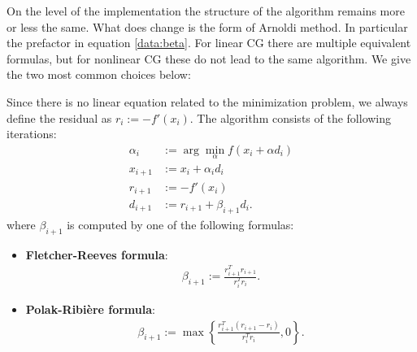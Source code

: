    On the level of the implementation the structure of the algorithm remains more or less the same. What does change is the form of Arnoldi method. In particular the prefactor in equation \ref{data:beta}. For linear CG there are multiple equivalent formulas, but for nonlinear CG these do not lead to the same algorithm. We give the two most common choices below:
    \begin{method}[Nonlinear CG]
        Since there is no linear equation related to the minimization problem, we always define the residual as $r_i:=-f'(x_i)$. The algorithm consists of the following iterations:
        \begin{align}
            \alpha_i &:= \arg\min_\alpha f(x_i+\alpha d_i)\label{data:argmin}\\
            x_{i+1} &:= x_i+\alpha_id_i\\
            r_{i+1} &:= -f'(x_i)\\
            d_{i+1} &:= r_{i+1}+\beta_{i+1}d_i.
        \end{align}
        where $\beta_{i+1}$ is computed by one of the following formulas:
        \begin{itemize}
            \item \textbf{Fletcher-Reeves formula}:
                \begin{gather}
                    \beta_{i+1} := \frac{r_{i+1}^Tr_{i+1}}{r_i^Tr_i}.
                \end{gather}
            \item \textbf{Polak-Ribi\`ere formula}:
                \begin{gather}
                    \label{data:polak_ribiere}
                    \beta_{i+1} := \max\left\{\frac{r_{i+1}^T(r_{i+1}-r_i)}{r_i^Tr_i}, 0\right\}.
                \end{gather}
        \end{itemize}
    \end{method}

